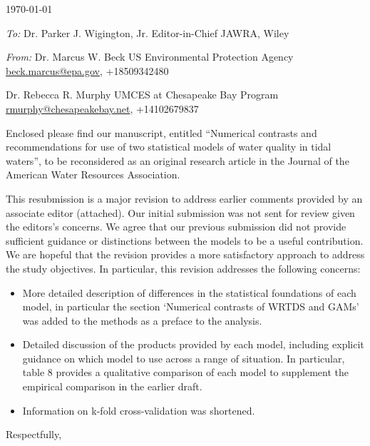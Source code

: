 \documentclass[a4paper,12pt]{article}
\begin{document}
\renewcommand{\rmdefault}{ptm}
\pagestyle{empty} 

\setlength{\parindent}{0mm} 
\setlength{\parskip}{5mm}

\begin{flushright}
\today
\end{flushright}

\emph{To:}\newline
Dr. Parker J. Wigington, Jr.\newline
Editor-in-Chief\newline
JAWRA, Wiley

\emph{From:}\newline
Dr. Marcus W. Beck\newline
US Environmental Protection Agency\newline
\href{mailto:beck.marcus@epa.gov}{beck.marcus@epa.gov}, +18509342480

Dr. Rebecca R. Murphy\newline
UMCES at Chesapeake Bay Program\newline
\href{mailto:rmurphy@chesapeakebay.net}{rmurphy@chesapeakebay.net}, +14102679837 \vspace{14.5pt}

Enclosed please find our manuscript, entitled ``Numerical contrasts and recommendations for use of two statistical models of water quality in tidal waters'', to be reconsidered as an original research article in the Journal of the American Water Resources Association.  

This resubmission is a major revision to address earlier comments provided by an associate editor (attached).  Our initial submission was not sent for review given the editors's concerns.  We agree that our previous submission did not provide sufficient guidance or distinctions between the models to be a useful contribution.  We are hopeful that the revision provides a more satisfactory approach to address the study objectives.  In particular, this revision addresses the following concerns: 
\begin{itemize}
\item More detailed description of differences in the statistical foundations of each model, in particular the section `Numerical contrasts of WRTDS and GAMs' was added to the methods as a preface to the analysis.  
\item Detailed discussion of the products provided by each model, including explicit guidance on which model to use across a range of situation.  In particular, table 8 provides a qualitative comparison of each model to supplement the empirical comparison in the earlier draft.  
\item Information on k-fold cross-validation was shortened.
\end{itemize}
\hspace{4.5in}Respectfully,
\end{document}
